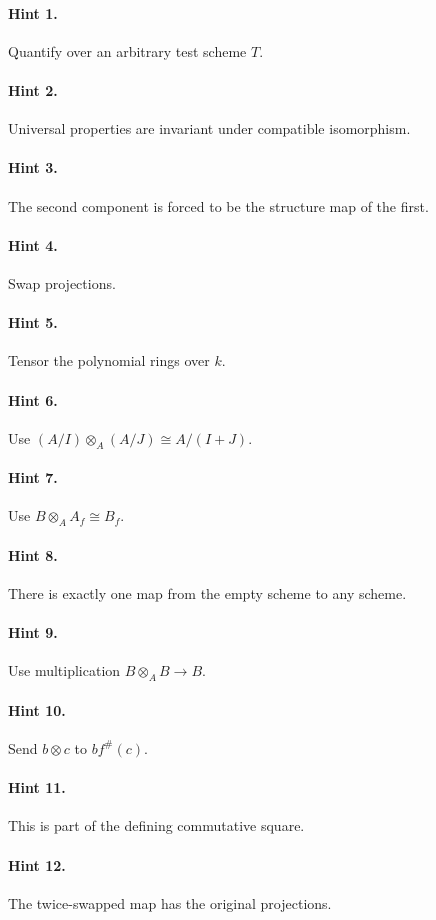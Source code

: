 \paragraph{Hint 1.} Quantify over an arbitrary test scheme $T$.
\paragraph{Hint 2.} Universal properties are invariant under compatible isomorphism.
\paragraph{Hint 3.} The second component is forced to be the structure map of the first.
\paragraph{Hint 4.} Swap projections.
\paragraph{Hint 5.} Tensor the polynomial rings over $k$.
\paragraph{Hint 6.} Use $(A/I)\otimes_A(A/J)\cong A/(I+J)$.
\paragraph{Hint 7.} Use $B\otimes_AA_f\cong B_{f}$.
\paragraph{Hint 8.} There is exactly one map from the empty scheme to any scheme.
\paragraph{Hint 9.} Use multiplication $B\otimes_AB\to B$.
\paragraph{Hint 10.} Send $b\otimes c$ to $b f^\#(c)$.
\paragraph{Hint 11.} This is part of the defining commutative square.
\paragraph{Hint 12.} The twice-swapped map has the original projections.
